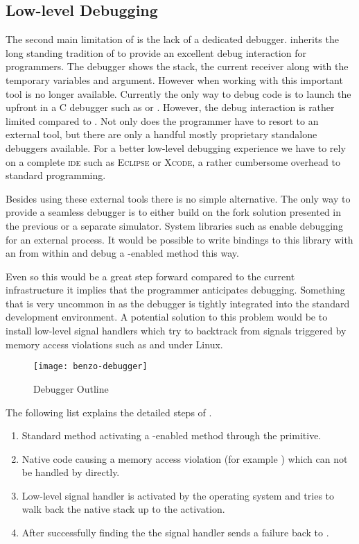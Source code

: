 \subsection{Low-level Debugging}
The second main limitation of \B is the lack of a dedicated debugger.
\PH inherits the long standing tradition of \ST to provide an excellent debug interaction for programmers.
The \PH debugger shows the stack, the current receiver along with the temporary variables and argument.
However when working with \B this important tool is no longer available.
Currently the only way to debug \B code is to launch the \VM upfront in a C debugger such as \GDB or \LLDB.
However, the debug interaction is rather limited compared to \PH.
Not only does the programmer have to resort to an external tool, but there are only a handful mostly proprietary standalone debuggers available.
For a better low-level debugging experience we have to rely on a complete \textsc{ide} such as \textsc{Eclipse} or \textsc{Xcode}, a rather cumbersome overhead to standard \PH programming.

Besides using these external tools there is no simple alternative.
The only way to provide a seamless debugger is to either build on the fork solution presented in the previous  or a separate simulator.
System libraries such as \ptrace enable debugging for an external process.
It would be possible to write bindings to this library with an \FFI from within \PH and debug a \B-enabled method this way.

Even so this would be a great step forward compared to the current infrastructure it implies that the programmer anticipates debugging.
Something that is very uncommon in \PH as the debugger is tightly integrated into the standard development environment.
A potential solution to this problem would be to install low-level signal handlers which try to backtrack from signals triggered by memory access violations such as  and  under Linux.

\begin{figure}[h]
	\centering
	\texttt{[image: benzo-debugger]}
	\caption{\B Debugger Outline}
\end{figure}

The following list explains the detailed steps of .
\begin{enumerate}
	\item Standard \PH method activating a \B-enabled method through the  primitive.
	\item Native code causing a memory access violation (for example ) which can not be handled by \PH directly.
	\item Low-level signal handler is activated by the operating system and tries to walk back the native stack up to the  activation.
	\item After successfully finding the  the signal handler sends a \B failure back to \PH.
\end{enumerate}

